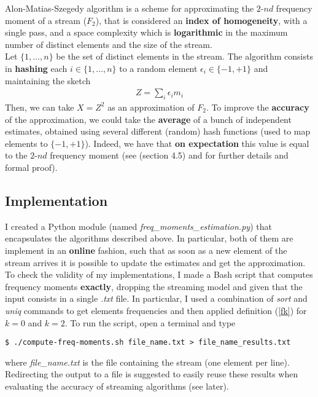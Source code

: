 Alon-Matias-Szegedy algorithm is a scheme for approximating the $2\text{-}nd$ frequency moment of a stream ($F_2$), that is considered an \textbf{index of homogeneity}, with a single pass, and a space complexity which is \textbf{logarithmic} in the maximum number of distinct elements and the size of the stream.\\
Let $\{1,\ldots,n\}$ be the set of distinct elements in the stream. The algorithm consists in \textbf{hashing} each $i \in \{1,\ldots,n\}$ to a random element $\epsilon_i \in \{-1,+1\}$ and maintaining the sketch
\begin{align}
	Z = \sum_{i} \epsilon_i m_i
\end{align}
Then, we can take $X = Z^2$ as an approximation of $F_2$. To improve the \textbf{accuracy} of the approximation, we could take the \textbf{average} of a bunch of independent estimates, obtained using several different (random) hash functions (used to map elements to $\{-1,+1\}$). Indeed, we have that \textbf{on expectation} this value is equal to the $2\text{-}nd$ frequency moment (see \cite{mmd} (section 4.5) and \cite{dm-streams} for further details and formal proof).


\subsection{Implementation}

I created a Python module (named \textit{freq\_moments\_estimation.py}) that encapsulates the algorithms described above. In particular, both of them are implement in an \textbf{online} fashion, such that as soon as a new element of the stream arrives it is possible to update the estimates and get the approximation.\\
To check the validity of my implementations, I made a Bash script that computes frequency moments \textbf{exactly}, dropping the streaming model and given that the input consists in a single \textit{.txt} file. In particular, I used a combination of \textit{sort} and \textit{uniq} commands to get elements frequencies and then applied definition (\ref{fk}) for $k = 0$ and $k = 2$. To run the script, open a terminal and type
\begin{lstlisting}
$ ./compute-freq-moments.sh file_name.txt > file_name_results.txt
\end{lstlisting}
where \textit{file\_name.txt} is the file containing the stream (one element per line). Redirecting the output to a file is suggested to easily reuse these results when evaluating the accuracy of streaming algorithms (see later).\\

